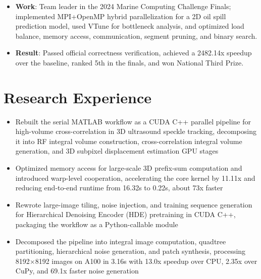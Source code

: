 \begin{itemize}
  \item \textbf{Work}: Team leader in the 2024 Marine Computing Challenge Finals; implemented MPI+OpenMP hybrid parallelization for a 2D oil spill prediction model, used VTune for bottleneck analysis, and optimized load balance, memory access, communication, segment pruning, and binary search.
  \item \textbf{Result}: Passed official correctness verification, achieved a 2482.14x speedup over the baseline, ranked 5th in the finals, and won National Third Prize.
\end{itemize}

\section{Research Experience}
\begin{itemize}
  \item Rebuilt the serial MATLAB workflow as a CUDA C++ parallel pipeline for high-volume cross-correlation in 3D ultrasound speckle tracking, decomposing it into RF integral volume construction, cross-correlation integral volume generation, and 3D subpixel displacement estimation GPU stages
  \item Optimized memory access for large-scale 3D prefix-sum computation and introduced warp-level cooperation, accelerating the core kernel by 11.11x and reducing end-to-end runtime from 16.32s to 0.22s, about 73x faster
\end{itemize}

\begin{itemize}
  \item Rewrote large-image tiling, noise injection, and training sequence generation for Hierarchical Denoising Encoder (HDE) pretraining in CUDA C++, packaging the workflow as a Python-callable module
  \item Decomposed the pipeline into integral image computation, quadtree partitioning, hierarchical noise generation, and patch synthesis, processing 8192$\times$8192 images on A100 in 3.16s with 13.0x speedup over CPU, 2.35x over CuPy, and 69.1x faster noise generation
\end{itemize}

